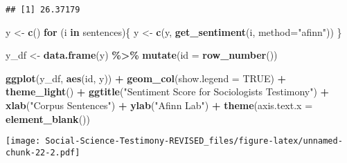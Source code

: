 \documentclass[]{article}
\newenvironment{Shaded}{\begin{snugshade}}{\end{snugshade}}
\newcommand{\ControlFlowTok}[1]{\textcolor[rgb]{0.13,0.29,0.53}{\textbf{#1}}}
\newcommand{\DataTypeTok}[1]{\textcolor[rgb]{0.13,0.29,0.53}{#1}}
\newcommand{\DecValTok}[1]{\textcolor[rgb]{0.00,0.00,0.81}{#1}}
\newcommand{\KeywordTok}[1]{\textcolor[rgb]{0.13,0.29,0.53}{\textbf{#1}}}
\newcommand{\NormalTok}[1]{#1}
\newcommand{\OperatorTok}[1]{\textcolor[rgb]{0.81,0.36,0.00}{\textbf{#1}}}
\newcommand{\OtherTok}[1]{\textcolor[rgb]{0.56,0.35,0.01}{#1}}
\newcommand{\StringTok}[1]{\textcolor[rgb]{0.31,0.60,0.02}{#1}}
\begin{document}
\hypertarget{htmlwidget-6a0b02d1b873147e134c}{}

\begin{Shaded}
\end{Shaded}

\begin{verbatim}
## [1] 26.37179
\end{verbatim}

\begin{Shaded}
\begin{Highlighting}[]
\NormalTok{y \textless{}{-}}\StringTok{ }\KeywordTok{c}\NormalTok{()}
\ControlFlowTok{for}\NormalTok{ (i }\ControlFlowTok{in}\NormalTok{ sentences)\{}
\NormalTok{  y \textless{}{-}}\StringTok{ }\KeywordTok{c}\NormalTok{(y, }\KeywordTok{get\_sentiment}\NormalTok{(i, }\DataTypeTok{method=}\StringTok{"afinn"}\NormalTok{))}
\NormalTok{\}}

\NormalTok{y\_df \textless{}{-}}\StringTok{ }\KeywordTok{data.frame}\NormalTok{(y) }\OperatorTok{\%\textgreater{}\%}\StringTok{ }
\StringTok{  }\KeywordTok{mutate}\NormalTok{(}\DataTypeTok{id =} \KeywordTok{row\_number}\NormalTok{())}

\KeywordTok{ggplot}\NormalTok{(y\_df, }\KeywordTok{aes}\NormalTok{(id, y)) }\OperatorTok{+}
\StringTok{  }\KeywordTok{geom\_col}\NormalTok{(}\DataTypeTok{show.legend =} \OtherTok{TRUE}\NormalTok{) }\OperatorTok{+}
\StringTok{  }\KeywordTok{theme\_light}\NormalTok{() }\OperatorTok{+}\StringTok{ }
\StringTok{  }\KeywordTok{ggtitle}\NormalTok{(}\StringTok{"Sentiment Score for Sociologist\textquotesingle{}s Testimony"}\NormalTok{) }\OperatorTok{+}\StringTok{  }
\StringTok{  }\KeywordTok{xlab}\NormalTok{(}\StringTok{"Corpus Sentences"}\NormalTok{) }\OperatorTok{+}\StringTok{ }
\StringTok{  }\KeywordTok{ylab}\NormalTok{(}\StringTok{"Afinn Lab"}\NormalTok{) }\OperatorTok{+}\StringTok{ }
\StringTok{  }\KeywordTok{theme}\NormalTok{(}\DataTypeTok{axis.text.x =} \KeywordTok{element\_blank}\NormalTok{()) }
\end{Highlighting}
\end{Shaded}

\texttt{[image: Social-Science-Testimony-REVISED\_files/figure-latex/unnamed-chunk-22-2.pdf]}
\end{document}
